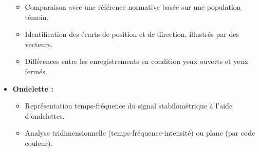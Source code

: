 \begin{itemize}
\begin{itemize}
    \item Comparaison avec une référence normative basée sur une population témoin.
    \item Identification des écarts de position et de direction, illustrés par des vecteurs.
    \item Différences entre les enregistrements en condition yeux ouverts et yeux fermés.
    \end{itemize}
    \item \textbf{Ondelette :}
    \begin{itemize}
        \item Représentation temps-fréquence du signal stabilométrique à l’aide d’ondelettes.
    \item Analyse tridimensionnelle (temps-fréquence-intensité) ou plane (par code couleur).
    \end{itemize}
\end{itemize}




